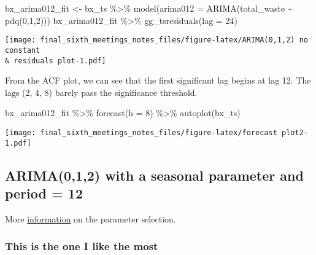 \documentclass[
]{article}
\newenvironment{Shaded}{\begin{snugshade}}{\end{snugshade}}
\newcommand{\AttributeTok}[1]{\textcolor[rgb]{0.77,0.63,0.00}{#1}}
\newcommand{\DecValTok}[1]{\textcolor[rgb]{0.00,0.00,0.81}{#1}}
\newcommand{\FunctionTok}[1]{\textcolor[rgb]{0.00,0.00,0.00}{#1}}
\newcommand{\NormalTok}[1]{#1}
\newcommand{\OtherTok}[1]{\textcolor[rgb]{0.56,0.35,0.01}{#1}}
\newcommand{\SpecialCharTok}[1]{\textcolor[rgb]{0.00,0.00,0.00}{#1}}
\begin{document}
\begin{Shaded}
\begin{Highlighting}[]
\NormalTok{bx\_arima012\_fit }\OtherTok{\textless{}{-}}\NormalTok{ bx\_ts }\SpecialCharTok{\%\textgreater{}\%} \FunctionTok{model}\NormalTok{(}\AttributeTok{arima012 =} \FunctionTok{ARIMA}\NormalTok{(total\_waste }\SpecialCharTok{\textasciitilde{}} \FunctionTok{pdq}\NormalTok{(}\DecValTok{0}\NormalTok{,}\DecValTok{1}\NormalTok{,}\DecValTok{2}\NormalTok{)))}
\NormalTok{bx\_arima012\_fit }\SpecialCharTok{\%\textgreater{}\%} \FunctionTok{gg\_tsresiduals}\NormalTok{(}\AttributeTok{lag =} \DecValTok{24}\NormalTok{)}
\end{Highlighting}
\end{Shaded}

\texttt{[image: final\_sixth\_meetings\_notes\_files/figure-latex/ARIMA(0,1,2) no constant \\\& residuals plot-1.pdf]}

From the ACF plot, we can see that the first significant lag begins at
lag 12. The lags (2, 4, 8) barely pass the significance threshold.

\begin{Shaded}
\begin{Highlighting}[]
\NormalTok{bx\_arima012\_fit }\SpecialCharTok{\%\textgreater{}\%} \FunctionTok{forecast}\NormalTok{(}\AttributeTok{h =} \DecValTok{8}\NormalTok{) }\SpecialCharTok{\%\textgreater{}\%} \FunctionTok{autoplot}\NormalTok{(bx\_ts)}
\end{Highlighting}
\end{Shaded}

\texttt{[image: final\_sixth\_meetings\_notes\_files/figure-latex/forecast plot2-1.pdf]}

\hypertarget{arima012-with-a-seasonal-parameter-and-period-12}{%
\subsection{ARIMA(0,1,2) with a seasonal parameter and period =
12}\label{arima012-with-a-seasonal-parameter-and-period-12}}

More
\href{https://fable.tidyverts.org/reference/ARIMA.html}{information} on
the parameter selection.

\hypertarget{this-is-the-one-i-like-the-most}{%
\subsubsection{This is the one I like the
most}\label{this-is-the-one-i-like-the-most}}
\end{document}

